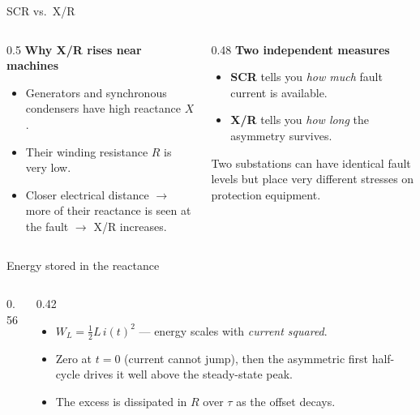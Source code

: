 \begin{frame}{SCR vs.\ X/R}
  \begin{columns}[T,onlytextwidth]
    \begin{column}{0.5\textwidth}
      \textbf{\color{atBlack}Why X/R rises near machines}
      \begin{itemize}
        \setlength{\itemsep}{0.4em}
        \item Generators and synchronous condensers have high reactance $X$.
        \item Their winding resistance $R$ is very low.
        \item Closer electrical distance $\rightarrow$ more of their reactance is
              seen at the fault $\rightarrow$ X/R increases.
      \end{itemize}
    \end{column}
    \begin{column}{0.48\textwidth}
      \textbf{\color{atBlack}Two independent measures}
      \begin{itemize}
        \setlength{\itemsep}{0.5em}
        \item \textbf{SCR} tells you \emph{how much} fault current is available.
        \item \textbf{X/R} tells you \emph{how long} the asymmetry survives.
      \end{itemize}
      \vspace{0.4em}
      \begin{block}{}
        \small Two substations can have identical fault levels but place very
        different stresses on protection equipment.
      \end{block}
    \end{column}
  \end{columns}
\end{frame}


\begin{frame}{Energy stored in the reactance}
  \begin{columns}[c,onlytextwidth]
    \begin{column}{0.56\textwidth}\centering
    \end{column}
    \begin{column}{0.42\textwidth}
      \begin{itemize}
        \setlength{\itemsep}{0.6em}
        \item $W_L=\tfrac{1}{2}L\,i(t)^2$ — energy scales with \emph{current squared}.
        \item Zero at $t=0$ (current cannot jump), then the asymmetric first
              half-cycle drives it well above the steady-state peak.
        \item The excess is dissipated in $R$ over $\tau$ as the offset decays.
      \end{itemize}
    \end{column}
  \end{columns}
\end{frame}


